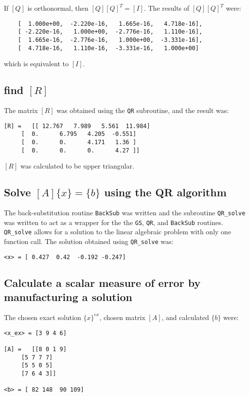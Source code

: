 \documentclass[letterpaper, 10pt, oneside]{article}
\begin{document}
If $[Q]$ is orthonormal, then $[Q][Q]^T = [I]$.  The results of $[Q][Q]^T$ were:

\begin{lstlisting}
	[  1.000e+00,  -2.220e-16,   1.665e-16,   4.718e-16],
	[ -2.220e-16,   1.000e+00,  -2.776e-16,   1.110e-16],
	[  1.665e-16,  -2.776e-16,   1.000e+00,  -3.331e-16],
	[  4.718e-16,   1.110e-16,  -3.331e-16,   1.000e+00]
\end{lstlisting}
which is equivalent to $[I]$.

\subsection{find $[R]$}
The matrix $[R]$ was obtained using the \verb|QR| subroutine, and the result was:

\begin{lstlisting}
[R] = 	[[ 12.767   7.989   5.561  11.984]
	 [  0.      6.795   4.205  -0.551]
	 [  0.      0.      4.171   1.36 ]
	 [  0.      0.      0.      4.27 ]]
\end{lstlisting}
$[R]$ was calculated to be upper triangular.

\subsection{Solve $[A]\{x\}=\{b\}$ using the QR algorithm}
The back-substitution routine \verb|BackSub| was written and the subroutine \verb|QR_solve| was written to act as a wrapper for the the \verb|GS|, \verb|QR|, and \verb|BackSub| routines. \verb|QR_solve| allows for a solution to the linear algebraic problem with only one function call.  The solution obtained using \verb|QR_solve| was:

\begin{lstlisting}
<x> = [ 0.427  0.42  -0.192 -0.247]
\end{lstlisting}

\subsection{Calculate a scalar measure of error by manufacturing a solution}
The chosen exact solution $\{x\}^{ex}$, chosen matrix $[A]$, and calculated $\{b\}$ were:
\begin{lstlisting}
<x_ex> = [3 9 4 6]

[A] = 	[[8 0 1 9]
	 [5 7 7 7]
	 [5 5 0 5]
	 [7 6 4 3]]

<b> = [ 82 148  90 109]
\end{lstlisting}
\end{document}
